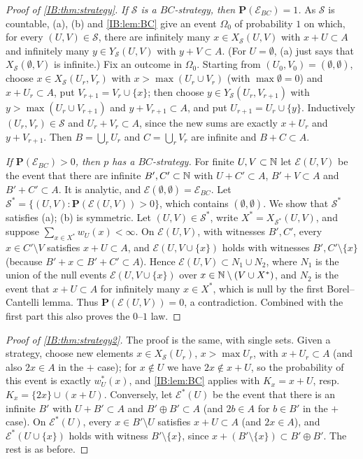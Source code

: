 \begin{proof}[Proof of \cref{IB:thm:strategy}]
\emph{If $\mathcal S$ is a $BC$-strategy, then $\mathbf P(\mathcal E_{BC})=1$.} As $\mathcal S$ is countable,
(a), (b) and \cref{IB:lem:BC} give an event $\Omega_0$ of probability $1$ on which, for
every $(U,V)\in\mathcal S$, there are infinitely many $x\in X_{\mathcal S}(U,V)$ with $x+U\subset A$
and infinitely many $y\in Y_{\mathcal S}(U,V)$ with $y+V\subset A$. (For $U=\emptyset$, (a) just
says that $X_{\mathcal S}(\emptyset,V)$ is infinite.) Fix an outcome in $\Omega_0$. Starting
from $(U_0,V_0)=(\emptyset,\emptyset)$, choose $x\in X_{\mathcal S}(U_r,V_r)$ with
$x>\max(U_r\cup V_r)$ (with $\max\emptyset=0$) and $x+U_r\subset A$, put $V_{r+1}=V_r\cup\{x\}$; then choose
$y\in Y_{\mathcal S}(U_r,V_{r+1})$ with $y>\max(U_r\cup V_{r+1})$ and $y+V_{r+1}\subset A$, and put
$U_{r+1}=U_r\cup\{y\}$. Inductively $(U_r,V_r)\in\mathcal S$ and $U_r+V_r\subset A$, since the new
sums are exactly $x+U_r$ and $y+V_{r+1}$. Then $B=\bigcup_rU_r$ and $C=\bigcup_rV_r$ are
infinite and $B+C\subset A$.

\emph{If $\mathbf P(\mathcal E_{BC})>0$, then $p$ has a $BC$-strategy.} For finite $U,V\subset\mathbb{N}$ let
$\mathcal E(U,V)$ be the event that there are infinite $B',C'\subset\mathbb{N}$ with $U+C'\subset A$,
$B'+V\subset A$ and $B'+C'\subset A$. It is analytic, and $\mathcal E(\emptyset,\emptyset)=\mathcal E_{BC}$. Let
$\mathcal S^\ast=\{(U,V):\mathbf P(\mathcal E(U,V))>0\}$, which contains $(\emptyset,\emptyset)$. We show that
$\mathcal S^\ast$ satisfies (a); (b) is symmetric. Let $(U,V)\in\mathcal S^\ast$, write
$X^\ast=X_{\mathcal S^\ast}(U,V)$, and suppose $\sum_{x\in X^\ast}w_U(x)<\infty$. On
$\mathcal E(U,V)$, with witnesses $B',C'$, every $x\in C'\setminus V$ satisfies $x+U\subset A$, and
$\mathcal E(U,V\cup\{x\})$ holds with witnesses $B',C'\setminus\{x\}$ (because $B'+x\subset B'+C'\subset A$).
Hence $\mathcal E(U,V)\subset N_1\cup N_2$, where $N_1$ is the union of the null events
$\mathcal E(U,V\cup\{x\})$ over $x\in\mathbb{N}\setminus(V\cup X^\ast)$, and $N_2$ is the event that $x+U\subset A$ for
infinitely many $x\in X^\ast$, which is null by the first Borel--Cantelli lemma. Thus
$\mathbf P(\mathcal E(U,V))=0$, a contradiction. Combined with the first part this also proves
the $0$--$1$ law.
\end{proof}

\begin{proof}[Proof of \cref{IB:thm:strategy2}]
The proof is the same, with single sets. Given a strategy, choose new elements
$x\in X_{\mathcal S}(U_r)$, $x>\max U_r$, with $x+U_r\subset A$ (and also $2x\in A$ in the
$+$ case); for $x\notin U$ we have $2x\notin x+U$, so the probability of this event is
exactly $w^\ast_U(x)$, and \cref{IB:lem:BC} applies with $K_x=x+U$, resp.\
$K_x=\{2x\}\cup(x+U)$. Conversely, let $\mathcal E^\ast(U)$ be the event that there is an infinite
$B'$ with $U+B'\subset A$ and $B'\oplus B'\subset A$ (and $2b\in A$ for $b\in B'$ in the $+$ case).
On $\mathcal E^\ast(U)$, every $x\in B'\setminus U$ satisfies $x+U\subset A$ (and $2x\in A$), and
$\mathcal E^\ast(U\cup\{x\})$ holds with witness $B'\setminus\{x\}$, since
$x+(B'\setminus\{x\})\subset B'\oplus B'$. The rest is as before.
\end{proof}

